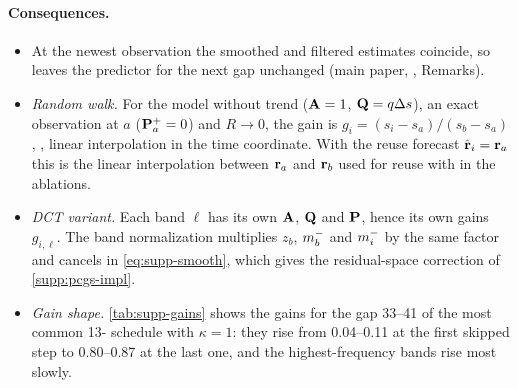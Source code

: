 \paragraph{Consequences.}
\begin{itemize}[leftmargin=*,itemsep=1pt,topsep=2pt]
  \item At the newest observation the smoothed and filtered estimates coincide, so \pcgs leaves the predictor for the
  next gap unchanged (main paper, , Remarks).
  \item \emph{Random walk.} For the model without trend ($\mathbf{A}=1$, $\mathbf{Q}=q\Delta s$), an exact observation at $a$
  ($\mathbf{P}^{+}_a=0$) and $R\to0$, the gain is $g_i=(s_i-s_a)/(s_b-s_a)$, \ie, linear interpolation in the time
  coordinate. With the reuse forecast $\hat{\mathbf{r}}_i=\mathbf{r}_a$ this is the linear interpolation between $\mathbf{r}_a$ and $\mathbf{r}_b$
  used for reuse with \pcgs in the ablations.
  \item \emph{DCT variant.} Each band $\ell$ has its own $\mathbf{A}$, $\mathbf{Q}$ and $\mathbf{P}$, hence its own gains $g_{i,\ell}$. The
  band normalization multiplies $z_b$, $m^{-}_b$ and $m^{-}_i$ by the same factor and cancels in
  \eqref{eq:supp-smooth}, which gives the residual-space correction of \cref{supp:pcgs-impl}.
  \item \emph{Gain shape.} \cref{tab:supp-gains} shows the gains for the gap 33--41 of the most common 13-\nfe
  schedule with $\kappa{=}1$: they rise from 0.04--0.11 at the first skipped step to 0.80--0.87 at the last one, and the
  highest-frequency bands rise most slowly.
\end{itemize}



